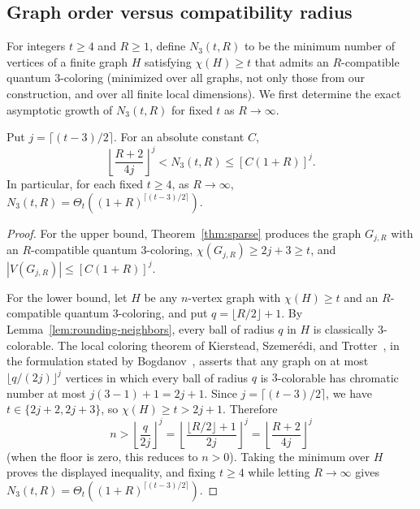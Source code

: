 \subsection{Graph order versus compatibility radius}\label{sec:order}

For integers $t\ge4$ and $R\ge1$, define $N_3(t,R)$ to be the minimum number of vertices of a finite graph $H$ satisfying $\chi(H)\ge t$ that admits an $R$-compatible quantum $3$-coloring (minimized over all graphs, not only those from our construction, and over all finite local dimensions). We first determine the exact asymptotic growth of $N_3(t,R)$ for fixed $t$ as $R\to\infty$.

\begin{corollary}\label{cor:radius}
Put $j=\lceil(t-3)/2\rceil$. For an absolute constant $C$,
\[
 \left\lfloor\frac{R+2}{4j}\right\rfloor^j
 < N_3(t,R) \le [C(1+R)]^j.
\]
In particular, for each fixed $t\ge4$, as $R\to\infty$, $N_3(t,R)=\Theta_t((1+R)^{\lceil(t-3)/2\rceil})$.
\end{corollary}
\begin{proof}
For the upper bound, Theorem~\ref{thm:sparse} produces the graph $G_{j,R}$ with an $R$-compatible quantum $3$-coloring, $\chi(G_{j,R})\ge2j+3\ge t$, and $|V(G_{j,R})|\le[C(1+R)]^j$.

For the lower bound, let $H$ be any $n$-vertex graph with $\chi(H)\ge t$ and an $R$-compatible quantum $3$-coloring, and put $q=\lfloor R/2\rfloor+1$. By Lemma~\ref{lem:rounding-neighbors}, every ball of radius $q$ in $H$ is classically $3$-colorable. The local coloring theorem of Kierstead, Szemer{\'e}di, and Trotter~\cite[Theorem~1]{KST}, in the formulation stated by Bogdanov~\cite[Equation~(1.1)]{BogOrder}, asserts that any graph on at most $\lfloor q/(2j)\rfloor^j$ vertices in which every ball of radius $q$ is $3$-colorable has chromatic number at most $j(3-1)+1=2j+1$. Since $j=\lceil(t-3)/2\rceil$, we have $t\in\{2j+2,2j+3\}$, so $\chi(H)\ge t>2j+1$. Therefore
\[
 n>\left\lfloor\frac{q}{2j}\right\rfloor^j
 =\left\lfloor\frac{\lfloor R/2\rfloor+1}{2j}\right\rfloor^j
 =\left\lfloor\frac{R+2}{4j}\right\rfloor^j
\]
(when the floor is zero, this reduces to $n>0$). Taking the minimum over $H$ proves the displayed inequality, and fixing $t\ge4$ while letting $R\to\infty$ gives $N_3(t,R)=\Theta_t((1+R)^{\lceil(t-3)/2\rceil})$.
\end{proof}

